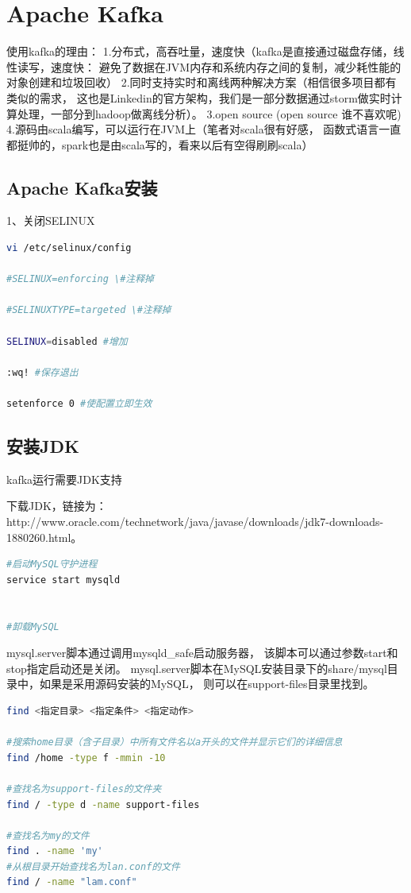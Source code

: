 \documentclass{book}
\begin{document}
\section{Apache Kafka}

使用kafka的理由：
1.分布式，高吞吐量，速度快（kafka是直接通过磁盘存储，线性读写，速度快：
避免了数据在JVM内存和系统内存之间的复制，减少耗性能的对象创建和垃圾回收）
2.同时支持实时和离线两种解决方案（相信很多项目都有类似的需求，
这也是Linkedin的官方架构，我们是一部分数据通过storm做实时计算处理，一部分到hadoop做离线分析）。
3.open source (open source 谁不喜欢呢)
4.源码由scala编写，可以运行在JVM上（笔者对scala很有好感，
函数式语言一直都挺帅的，spark也是由scala写的，看来以后有空得刷刷scala）

\subsection{Apache Kafka安装}

1、关闭SELINUX

\begin{lstlisting}[language=Bash]
vi /etc/selinux/config

#SELINUX=enforcing \#注释掉

#SELINUXTYPE=targeted \#注释掉

SELINUX=disabled #增加

:wq! #保存退出

setenforce 0 #使配置立即生效
\end{lstlisting}

\subsection{安装JDK}

kafka运行需要JDK支持

下载JDK，链接为：http://www.oracle.com/technetwork/java/javase/downloads/jdk7-downloads-1880260.html。

\begin{lstlisting}[language=Bash]
#启动MySQL守护进程
service start mysqld


#卸载MySQL

\end{lstlisting}

mysql.server脚本通过调用mysqld\_safe启动服务器，
该脚本可以通过参数start和stop指定启动还是关闭。
mysql.server脚本在MySQL安装目录下的share/mysql目录中，如果是采用源码安装的MySQL，
则可以在support-files目录里找到。

\begin{lstlisting}[language=Bash]
find <指定目录> <指定条件> <指定动作>

#搜索home目录（含子目录）中所有文件名以a开头的文件并显示它们的详细信息
find /home -type f -mmin -10

#查找名为support-files的文件夹
find / -type d -name support-files

#查找名为my的文件
find . -name 'my'
#从根目录开始查找名为lan.conf的文件
find / -name "lam.conf"
\end{lstlisting}
\end{document}
